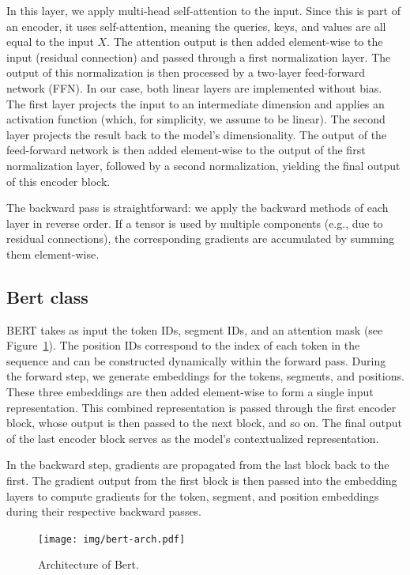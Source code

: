 \documentclass{../../../extra/aakpract/aakpract}
\begin{document}
In this layer, we apply multi-head self-attention to the input. 
Since this is part of an encoder, it uses self-attention, meaning the queries, keys, and values are all equal to the input $X$.
The attention output is then added element-wise to the input (residual connection) and passed through a first normalization layer.
The output of this normalization is then processed by a two-layer feed-forward network (FFN). 
In our case, both linear layers are implemented without bias. 
The first layer projects the input to an intermediate dimension and applies an activation function (which, for simplicity, we assume to be linear). 
The second layer projects the result back to the model's dimensionality. 
The output of the feed-forward network is then added element-wise to the output of the first normalization layer, followed by a second normalization, yielding the final output of this encoder block.

The backward pass is straightforward: we apply the backward methods of each layer in reverse order. 
If a tensor is used by multiple components (e.g., due to residual connections), the corresponding gradients are accumulated by summing them element-wise.


\subsection{Bert class}

BERT takes as input the token IDs, segment IDs, and an attention mask (see Figure~\ref{fig:mybert2}). 
The position IDs correspond to the index of each token in the sequence and can be constructed dynamically within the forward pass.
During the forward step, we generate embeddings for the tokens, segments, and positions. 
These three embeddings are then added element-wise to form a single input representation. 
This combined representation is passed through the first encoder block, whose output is then passed to the next block, and so on. 
The final output of the last encoder block serves as the model’s contextualized representation.

In the backward step, gradients are propagated from the last block back to the first. 
The gradient output from the first block is then passed into the embedding layers to compute gradients for the token, segment, and position embeddings during their respective backward passes.


\begin{figure}[htp]
	\centering
	\texttt{[image: img/bert-arch.pdf]}
	\caption{Architecture of Bert.}
	\label{fig:mybert2}
\end{figure}
\end{document}
